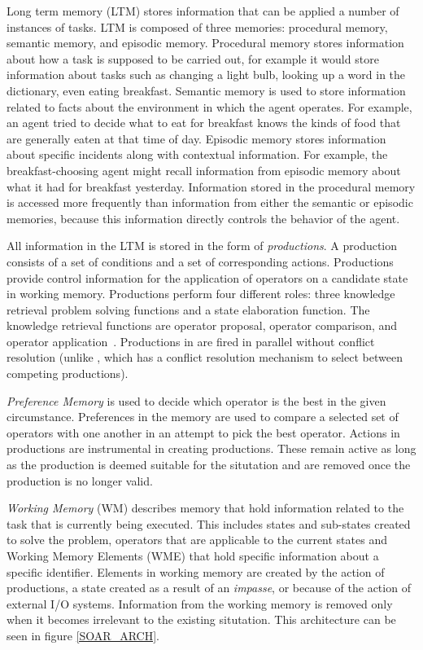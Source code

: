 Long term memory (LTM) stores information that can be applied a number
of instances of tasks. LTM is composed of three memories: procedural
memory, semantic memory, and episodic memory. Procedural memory stores
information about how a task is supposed to be carried out, for
example it would store information about tasks such as changing a
light bulb, looking up a word in the dictionary, even eating
breakfast.  Semantic memory is used to store information related to
facts about the environment in which the agent operates.  For example,
an agent tried to decide what to eat for breakfast knows the kinds of
food that are generally eaten at that time of day.  Episodic memory
stores information about specific incidents along with contextual
information.  For example, the breakfast-choosing agent might recall
information from episodic memory about what it had for breakfast
yesterday.  Information stored in the procedural memory is accessed
more frequently than information from either the semantic or episodic
memories, because this information directly controls the behavior of
the agent.

All information in the LTM is stored in the form of
\emph{productions}. A production consists of a set of conditions and a
set of corresponding actions. Productions provide control information
for the application of operators on a candidate state in  working
memory. Productions perform four different roles: three knowledge
retrieval problem solving functions and a state elaboration
function. The knowledge retrieval functions are operator proposal,
operator comparison, and operator
application~\cite{Laird:2006aa}. Productions in \soar are fired in
parallel without conflict resolution (unlike \actr, which has a
conflict resolution mechanism to select between competing
productions).

\emph{Preference Memory} is used to decide which operator is the best in the
given circumstance.  Preferences in the memory are used to compare a
selected set of operators with one another in an attempt to pick 
the best operator. Actions in productions are instrumental in creating
productions. These remain active as long as the production is deemed
suitable for the situtation and are removed once the production is no longer
valid.

\emph{Working Memory} (WM) describes memory that hold information
related to the task that is currently being executed. This includes
states and sub-states created to solve the problem, operators that are
applicable to the current states and Working Memory Elements (WME)
that hold specific information about a specific identifier. Elements
in working memory are created by the action of productions, a state
created as a result of an \emph{impasse}, or because of the action of
external I/O systems. Information from the working memory is removed
only when it becomes irrelevant to the existing situtation. This
architecture can be seen in figure \ref{SOAR_ARCH}.

